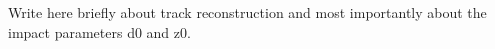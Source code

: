 Write here briefly about track reconstruction and most importantly about the
impact parameters d0 and z0.
